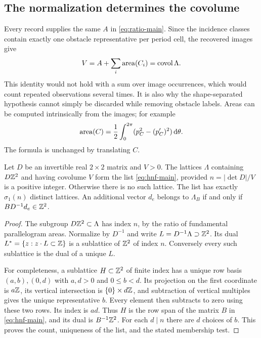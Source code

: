 \subsection{The normalization determines the covolume}
Every record supplies the same $A$ in \eqref{eq:ratio-main}. Since the
incidence classes contain exactly one obstacle representative per period
cell, the recovered images give
\[
             V=A+\sum_i\operatorname{area}(C_i)=\operatorname{covol}\Lambda.
\]
This identity would not hold with a sum over image occurrences, which
would count repeated observations several times. It is also why the
shape-separated hypothesis cannot simply be discarded while removing
obstacle labels. Areas can be computed intrinsically from the images;
for example
\begin{equation}\label{eq:support-area}
 \operatorname{area}(C)=\frac12\int_0^{2\pi}(p_C^2-(p_C')^2)\,\mathrm d\theta.
\end{equation}
The formula is unchanged by translating $C$.

\begin{lemma}\label{lem:overlattice}
Let $D$ be an invertible real $2\times2$ matrix and $V>0$. The lattices
$\Lambda$ containing $D\mathbb Z^2$ and having covolume $V$ form the list
\eqref{eq:hnf-main}, provided $n=|\det D|/V$ is a positive integer.
Otherwise there is no such lattice. The list has exactly $\sigma_1(n)$
distinct lattices. An additional vector $d_e$ belongs to $\Lambda_B$
if and only if $BD^{-1}d_e\in\mathbb Z^2$.
\end{lemma}
\begin{proof}
The subgroup $D\mathbb Z^2\subset\Lambda$ has index $n$, by the ratio of
fundamental parallelogram areas. Normalize by $D^{-1}$ and write
$L=D^{-1}\Lambda\supset\mathbb Z^2$. Its dual
$L^*=\{z:z\cdot L\subset\mathbb Z\}$ is a sublattice of $\mathbb Z^2$ of
index $n$. Conversely every such sublattice is the dual of a unique $L$.

For completeness, a sublattice $H\subset\mathbb Z^2$ of finite index has
a unique row basis $(a,b),(0,d)$ with $a,d>0$ and $0\le b<d$.
Its projection on the first coordinate is $a\mathbb Z$, its vertical intersection
is $\{0\}\times d\mathbb Z$, and subtraction of vertical multiples gives the
unique representative $b$. Every element then subtracts to zero using
these two rows. Its index is $ad$. Thus $H$ is the row span of the
matrix $B$ in \eqref{eq:hnf-main}, and its dual is $B^{-1}\mathbb Z^2$.
For each $d\mid n$ there are $d$ choices of $b$. This proves the count,
uniqueness of the list, and the stated membership test.
\end{proof}


